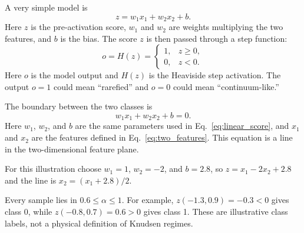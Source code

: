 \documentclass[11pt]{article}
\newcommand{\kn}{\mathrm{Kn}}
\begin{document}
A very simple model is
\begin{equation}
    z = w_1 x_1 + w_2 x_2 + b.
    \label{eq:linear_score}
\end{equation}
Here $z$ is the pre-activation score, $w_1$ and $w_2$ are weights multiplying the two features, and $b$ is the bias.  The score $z$ is then passed through a step function:
\begin{equation}
    o = H(z)=
    \begin{cases}
    1, & z\ge 0,\\
    0, & z<0.
    \end{cases}
    \label{eq:step_output}
\end{equation}
Here $o$ is the model output and $H(z)$ is the Heaviside step activation.  The output $o=1$ could mean ``rarefied'' and $o=0$ could mean ``continuum-like.''

The boundary between the two classes is
\begin{equation}
    w_1x_1+w_2x_2+b=0.
    \label{eq:decision_boundary}
\end{equation}
Here $w_1$, $w_2$, and $b$ are the same parameters used in Eq.~\eqref{eq:linear_score}, and $x_1$ and $x_2$ are the features defined in Eq.~\eqref{eq:two_features}.  This equation is a line in the two-dimensional feature plane.

For this illustration choose $w_1=1$, $w_2=-2$, and $b=2.8$, so
$z=x_1-2x_2+2.8$ and the line is $x_2=(x_1+2.8)/2$.
\begin{center}
\end{center}
Every sample lies in $0.6\leq\alpha\leq1$. For example,
$z(-1.3,0.9)=-0.3<0$ gives class 0, while $z(-0.8,0.7)=0.6>0$ gives class 1.
These are illustrative class labels, not a physical definition of Knudsen regimes.
\end{document}
